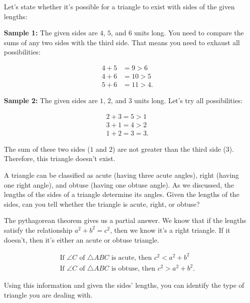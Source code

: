 \begin{example}
  \label{exm:triangle_inequality}

  Let's state whether it's possible for a triangle to exist with sides of the
  given lengths:

  \textbf{Sample 1:} The given sides are $4$, $5$, and $6$ units long. You
  need to compare the sums of any two sides with the third side. That means
  you need to exhaust all possibilities:

  \begin{align*}
    4 + 5 &= 9 > 6 \\
    4 + 6 &= 10 > 5 \\
    5 + 6 &= 11 > 4
  .\end{align*}

  \textbf{Sample 2:} The given sides are $1$, $2$, and $3$ units long. Let's
  try all possibilities:

  \begin{align*}
    2 + 3 = 5 > 1 \\
    3 + 1 = 4 > 2 \\
    1 + 2 = 3 = 3
  .\end{align*}

  The sum of these two sides ($1$ and $2$) are not greater than the third side
  ($3$). Therefore, this triangle doesn't exist.
\end{example}

A triangle can be classified as acute (having three acute angles), right
(having one right angle), and obtuse (having one obtuse angle). As we
discussed, the lengths of the sides of a triangle determine its angles. Given
the lengths of the sides, can you tell whether the triangle is acute, right, or
obtuse?

The pythagorean theorem gives us a partial answer. We know that if the lengths
satisfy the relationship $a^{2} + b^{2} = c^{2}$, then we know it's a right
triangle. If it doesn't, then it's either an acute or obtuse triangle.

\begin{align*}
  \textrm{If } \angle C \textrm{ of } \triangle ABC \textrm{ is acute, then } c^{2} < a^{2} + b^{2} \\
  \textrm{If } \angle C \textrm{ of } \triangle ABC \textrm{ is obtuse, then } c^{2} > a^{2} + b^{2}
.\end{align*}

Using this information and given the sides' lengths, you can identify the type
of triangle you are dealing with.

